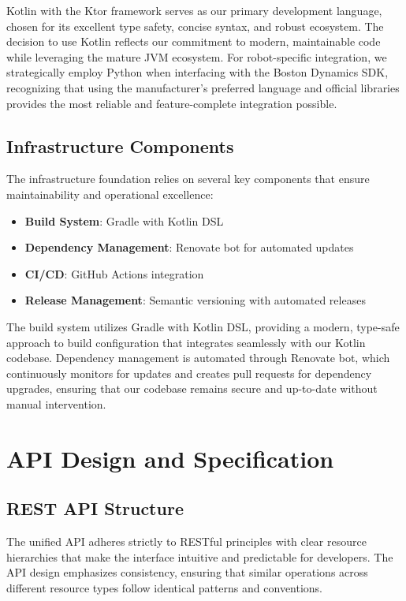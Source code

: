 \documentclass[runningheads]{llncs}
\begin{document}
Kotlin with the Ktor framework serves as our primary development language, chosen for its excellent type safety, concise syntax, and robust ecosystem. The decision to use Kotlin reflects our commitment to modern, maintainable code while leveraging the mature JVM ecosystem. For robot-specific integration, we strategically employ Python when interfacing with the Boston Dynamics SDK, recognizing that using the manufacturer's preferred language and official libraries provides the most reliable and feature-complete integration possible.

%
%
%
\subsection{Infrastructure Components}

The infrastructure foundation relies on several key components that ensure maintainability and operational excellence:

\begin{itemize}
    \item \textbf{Build System}: Gradle with Kotlin DSL
    \item \textbf{Dependency Management}: Renovate bot for automated updates
    \item \textbf{CI/CD}: GitHub Actions integration
    \item \textbf{Release Management}: Semantic versioning with automated releases
\end{itemize}

The build system utilizes Gradle with Kotlin DSL, providing a modern, type-safe approach to build configuration that integrates seamlessly with our Kotlin codebase. Dependency management is automated through Renovate bot, which continuously monitors for updates and creates pull requests for dependency upgrades, ensuring that our codebase remains secure and up-to-date without manual intervention.

%
%
%
\section{API Design and Specification}

\subsection{REST API Structure}

The unified API adheres strictly to RESTful principles with clear resource hierarchies that make the interface intuitive and predictable for developers. The API design emphasizes consistency, ensuring that similar operations across different resource types follow identical patterns and conventions.
\end{document}
